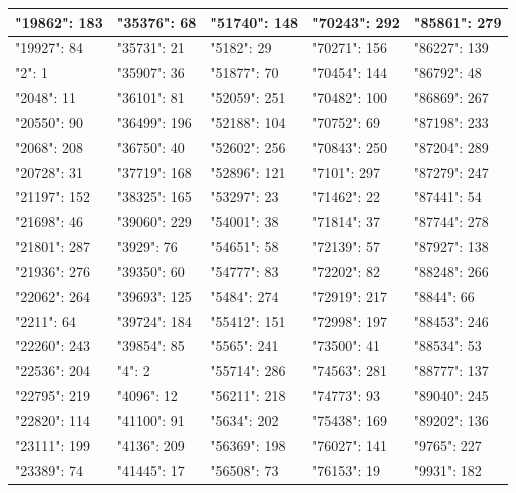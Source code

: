 \documentclass[11pt,letterpaper]{article}
\begin{document}
\begin{enumerate}[label=\alph*)]
\begin{itemize}
\begin{table}[H]
\begin{longtable}{|l|l|l|l|l|}
"19862": 183  & "35376": 68    &  "51740": 148  & "70243": 292  & "85861": 279 \\ \hline
"19927": 84   & "35731": 21    &  "5182": 29    & "70271": 156  & "86227": 139 \\ \hline
"2": 1        & "35907": 36    &  "51877": 70   & "70454": 144  & "86792": 48  \\ \hline
"2048": 11    & "36101": 81    &  "52059": 251  & "70482": 100  & "86869": 267 \\ \hline
"20550": 90   & "36499": 196   &  "52188": 104  & "70752": 69   & "87198": 233 \\ \hline
"2068": 208   & "36750": 40    &  "52602": 256  & "70843": 250  & "87204": 289 \\ \hline
"20728": 31   & "37719": 168   &  "52896": 121  & "7101": 297   & "87279": 247 \\ \hline
"21197": 152  & "38325": 165   &  "53297": 23   & "71462": 22   & "87441": 54  \\ \hline
"21698": 46   & "39060": 229   &  "54001": 38   & "71814": 37   & "87744": 278 \\ \hline
"21801": 287  & "3929": 76     &  "54651": 58   & "72139": 57   & "87927": 138 \\ \hline
"21936": 276  & "39350": 60    &  "54777": 83   & "72202": 82   & "88248": 266 \\ \hline
"22062": 264  & "39693": 125   &  "5484": 274   & "72919": 217  & "8844": 66   \\ \hline
"2211": 64    & "39724": 184   &  "55412": 151  & "72998": 197  & "88453": 246 \\ \hline
"22260": 243  & "39854": 85    &  "5565": 241   & "73500": 41   & "88534": 53  \\ \hline
"22536": 204  & "4": 2         &  "55714": 286  & "74563": 281  & "88777": 137 \\ \hline
"22795": 219  & "4096": 12     &  "56211": 218  & "74773": 93   & "89040": 245 \\ \hline
"22820": 114  & "41100": 91    &  "5634": 202   & "75438": 169  & "89202": 136 \\ \hline
"23111": 199  & "4136": 209    &  "56369": 198  & "76027": 141  & "9765": 227  \\ \hline
"23389": 74   & "41445": 17    &  "56508": 73   & "76153": 19   & "9931": 182  \\ \hline
\end{longtable}
\end{table}


\end{itemize}
\end{enumerate}
\end{document}
